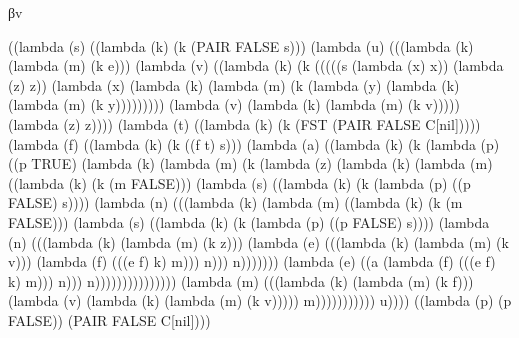 \documentclass[ms,electronic,twosidetoc,letterpaper,chaptercenter,parttop]{byumsphd}
\begin{document}
\begin{theorem}
βv
\begin{schemedisplay}
((lambda (s) ((lambda (k) (k (PAIR FALSE s)))
        (lambda (u) (((lambda (k) (lambda (m) (k e)))
                (lambda (v) ((lambda (k) (k (((((s (lambda (x) x)) (lambda (z) z))
                                   (lambda (x) (lambda (k) (lambda (m) (k (lambda (y) (lambda (k) (lambda (m) (k y)))))))))
                                  (lambda (v) (lambda (k) (lambda (m) (k v))))) (lambda (z) z))))
                       (lambda (t) ((lambda (k) (k (FST
                                        (PAIR FALSE C[nil]))))
                              (lambda (f) ((lambda (k) (k ((f t) s)))
                                     (lambda (a) ((lambda (k) (k (lambda (p) ((p TRUE)
                                                            (lambda (k) (lambda (m) (k (lambda (z) (lambda (k) (lambda (m) ((lambda (k) (k (m FALSE)))
                                                                                              (lambda (s) ((lambda (k) (k (lambda (p) ((p FALSE) s))))
                                                                                                     (lambda (n) (((lambda (k) (lambda (m) ((lambda (k) (k (m FALSE)))
                                                                                                                          (lambda (s) ((lambda (k) (k (lambda (p) ((p FALSE) s))))
                                                                                                                                 (lambda (n) (((lambda (k) (lambda (m) (k z)))
                                                                                                                                         (lambda (e) (((lambda (k) (lambda (m) (k v)))
                                                                                                                                                 (lambda (f) (((e f) k) m))) n))) n)))))))
                                                                                                             (lambda (e) ((a (lambda (f) (((e f) k) m))) n))) n)))))))))))))))
                                            (lambda (m) (((lambda (k) (lambda (m) (k f)))
                                                    (lambda (v) (lambda (k) (lambda (m) (k v))))) m))))))))))) u))))
 ((lambda (p) (p FALSE))
  (PAIR FALSE C[nil])))
\end{schemedisplay}


\end{theorem}
\end{document}
